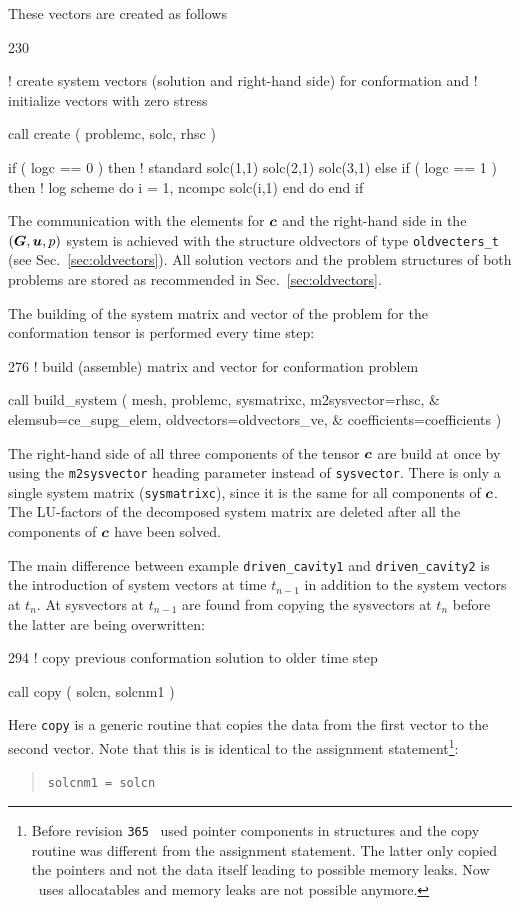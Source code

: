 These vectors are created as follows
\begin{listing}{230}

! create system vectors (solution and right-hand side) for conformation and
! initialize vectors with zero stress

  call create ( problemc, solc, rhsc )

  if ( logc == 0 ) then ! standard
    solc(1,1)%
    solc(2,1)%
    solc(3,1)%
  else if ( logc == 1 ) then ! log scheme
    do i = 1, ncompc
      solc(i,1)%
    end do
  end if

\end{listing}

The communication with the elements for $\boldsymbol{c}$ and the right-hand side in the 
$(\boldsymbol{G},\boldsymbol{u}, p)$ system is achieved with the structure oldvectors of type
\texttt{oldvecters\_t} (see Sec.~\ref{sec:oldvectors}). All solution vectors
and the problem structures of both problems are stored as recommended in
Sec.~\ref{sec:oldvectors}.

The building of the system matrix and vector of the problem for the
conformation tensor is performed every time step:

\begin{listing}{276}
   !   build (assemble) matrix and vector for conformation problem

    call build_system ( mesh, problemc, sysmatrixc, m2sysvector=rhsc, &
      elemsub=ce_supg_elem, oldvectors=oldvectors_ve, &
      coefficients=coefficients )
\end{listing}
The right-hand side of all three components of the tensor $\boldsymbol{c}$ are
build at once by using the \texttt{m2sysvector} heading parameter instead of
\texttt{sysvector}. There is only a single system matrix (\texttt{sysmatrixc}),
since it is the same for all components of $\boldsymbol{c}$. The LU-factors of the
decomposed system matrix are deleted after all the components of $\boldsymbol{c}$
have been solved. 

The main difference between example \texttt{driven\_cavity1} and
\texttt{driven\_cavity2} is the introduction of system vectors at time
$t_{n-1}$ in addition to the system vectors at $t_n$. At sysvectors at
$t_{n-1}$ are found from copying the sysvectors at $t_n$ before the latter are
being overwritten:
\begin{listing}{294}
!   copy previous conformation solution to older time step

    call copy ( solcn, solcnm1 )
\end{listing}
Here \texttt{copy} is a generic routine that copies the data 
from the first vector to the second vector. Note that this is 
is identical to the assignment statement\footnote{Before revision
\texttt{365} \tfem\ used pointer components in structures and the copy
routine was different from the assignment statement. The latter only copied the
pointers and not the data itself leading to possible memory leaks.
Now \tfem\ uses allocatables and memory leaks are not possible anymore.}:
\begin{quote}
   \texttt{solcnm1 = solcn}
\end{quote}

